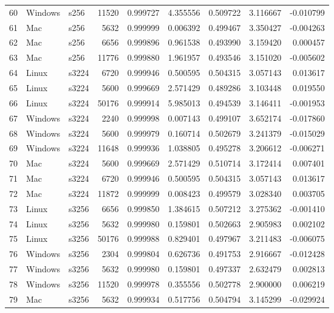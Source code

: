 \documentclass{IEEEtran}
\begin{document}
\begin{longtable}{rllrrrrrr}
  60 & Windows & s256 &   11520 & 0.999727 & 4.355556 & 0.509722 & 3.116667 & -0.010799 \\ 
  61 & Mac & s256 &    5632 & 0.999999 & 0.006392 & 0.499467 & 3.350427 & -0.004263 \\ 
  62 & Mac & s256 &    6656 & 0.999896 & 0.961538 & 0.493990 & 3.159420 & 0.000457 \\ 
  63 & Mac & s256 &   11776 & 0.999880 & 1.961957 & 0.493546 & 3.151020 & -0.005602 \\ 
  64 & Linux & s3224 &    6720 & 0.999946 & 0.500595 & 0.504315 & 3.057143 & 0.013617 \\ 
  65 & Linux & s3224 &    5600 & 0.999669 & 2.571429 & 0.489286 & 3.103448 & 0.019550 \\ 
  66 & Linux & s3224 &   50176 & 0.999914 & 5.985013 & 0.494539 & 3.146411 & -0.001953 \\ 
  67 & Windows & s3224 &    2240 & 0.999998 & 0.007143 & 0.499107 & 3.652174 & -0.017860 \\ 
  68 & Windows & s3224 &    5600 & 0.999979 & 0.160714 & 0.502679 & 3.241379 & -0.015029 \\ 
  69 & Windows & s3224 &   11648 & 0.999936 & 1.038805 & 0.495278 & 3.206612 & -0.006271 \\ 
  70 & Mac & s3224 &    5600 & 0.999669 & 2.571429 & 0.510714 & 3.172414 & 0.007401 \\ 
  71 & Mac & s3224 &    6720 & 0.999946 & 0.500595 & 0.504315 & 3.057143 & 0.013617 \\ 
  72 & Mac & s3224 &   11872 & 0.999999 & 0.008423 & 0.499579 & 3.028340 & 0.003705 \\ 
  73 & Linux & s3256 &    6656 & 0.999850 & 1.384615 & 0.507212 & 3.275362 & -0.001410 \\ 
  74 & Linux & s3256 &    5632 & 0.999980 & 0.159801 & 0.502663 & 2.905983 & 0.002102 \\ 
  75 & Linux & s3256 &   50176 & 0.999988 & 0.829401 & 0.497967 & 3.211483 & -0.006075 \\ 
  76 & Windows & s3256 &    2304 & 0.999804 & 0.626736 & 0.491753 & 2.916667 & -0.012428 \\ 
  77 & Windows & s3256 &    5632 & 0.999980 & 0.159801 & 0.497337 & 2.632479 & 0.002813 \\ 
  78 & Windows & s3256 &   11520 & 0.999978 & 0.355556 & 0.502778 & 2.900000 & 0.006219 \\ 
  79 & Mac & s3256 &    5632 & 0.999934 & 0.517756 & 0.504794 & 3.145299 & -0.029924 \\ 

\end{longtable}
\end{document}

